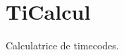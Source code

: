 \chapter{Ti\+Calcul}
\label{md__r_e_a_d_m_e}
\label{md__r_e_a_d_m_e_autotoc_md0}%
 Calculatrice de timecodes.

 